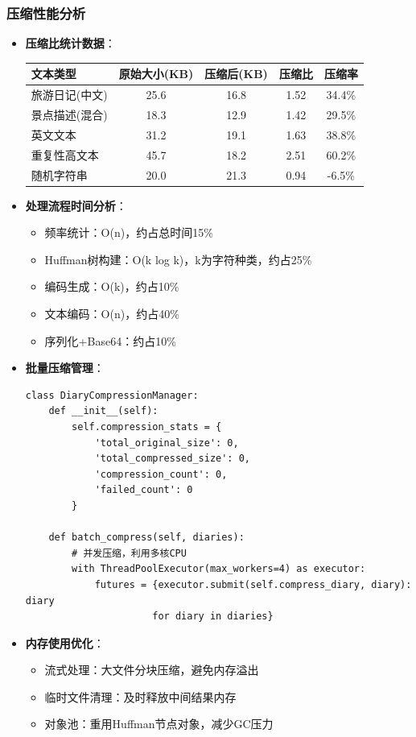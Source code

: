 \documentclass[12pt,a4paper]{article}
\begin{document}
\subsubsection{压缩性能分析}
\begin{itemize}
    \item \textbf{压缩比统计数据}：
    \begin{center}
    \begin{tabular}{|l|c|c|c|c|}
    \hline
    \textbf{文本类型} & \textbf{原始大小(KB)} & \textbf{压缩后(KB)} & \textbf{压缩比} & \textbf{压缩率} \\
    \hline
    旅游日记(中文) & 25.6 & 16.8 & 1.52 & 34.4\% \\
    景点描述(混合) & 18.3 & 12.9 & 1.42 & 29.5\% \\
    英文文本 & 31.2 & 19.1 & 1.63 & 38.8\% \\
    重复性高文本 & 45.7 & 18.2 & 2.51 & 60.2\% \\
    随机字符串 & 20.0 & 21.3 & 0.94 & -6.5\% \\
    \hline
    \end{tabular}
    \end{center}
    \item \textbf{处理流程时间分析}：
    \begin{itemize}
        \item 频率统计：O(n)，约占总时间15\%
        \item Huffman树构建：O(k log k)，k为字符种类，约占25\%
        \item 编码生成：O(k)，约占10\%
        \item 文本编码：O(n)，约占40\%
        \item 序列化+Base64：约占10\%
    \end{itemize}
    \item \textbf{批量压缩管理}：
    \begin{verbatim}
class DiaryCompressionManager:
    def __init__(self):
        self.compression_stats = {
            'total_original_size': 0,
            'total_compressed_size': 0, 
            'compression_count': 0,
            'failed_count': 0
        }
    
    def batch_compress(self, diaries):
        # 并发压缩，利用多核CPU
        with ThreadPoolExecutor(max_workers=4) as executor:
            futures = {executor.submit(self.compress_diary, diary): diary 
                      for diary in diaries}
    \end{verbatim}
    \item \textbf{内存使用优化}：
    \begin{itemize}
        \item 流式处理：大文件分块压缩，避免内存溢出
        \item 临时文件清理：及时释放中间结果内存
        \item 对象池：重用Huffman节点对象，减少GC压力
    \end{itemize}
\end{itemize}
\end{document}
